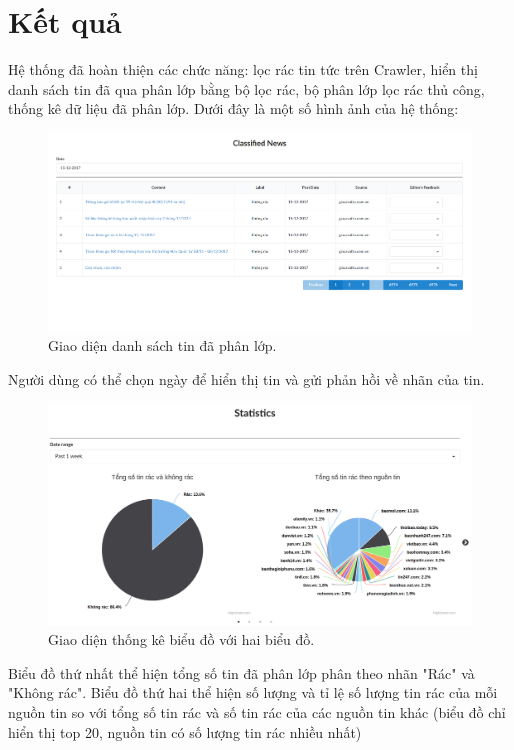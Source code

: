 \section{Kết quả}
Hệ thống đã hoàn thiện các chức năng: lọc rác tin tức trên Crawler, hiển thị danh sách tin đã qua phân lớp bằng bộ lọc rác, bộ phân lớp lọc rác thủ công, thống kê dữ liệu đã phân lớp. Dưới đây là một số hình ảnh của hệ thống:
\begin{figure}[H]
	\centering
	\includegraphics[width=1\linewidth]{Chapter3/Chapter3Figs/Classified.png}
	\caption{Giao diện danh sách tin đã phân lớp.}
	\label{fig:streaming}
\end{figure}
Người dùng có thể chọn ngày để hiển thị tin và gửi phản hồi về nhãn của tin.
\begin{figure}[H]
	\centering
	\includegraphics[width=0.96\linewidth]{Chapter3/Chapter3Figs/Chart1.png}
  \caption{Giao diện thống kê biểu đồ với hai biểu đồ.}
	\label{fig:streamingkeywords}
\end{figure}
 Biểu đồ thứ nhất thể hiện tổng số tin đã phân lớp phân theo nhãn "Rác" và "Không rác". Biểu đồ thứ hai thể hiện số lượng và tỉ lệ số lượng tin rác của mỗi nguồn tin so với tổng số tin rác và số tin rác của các nguồn tin khác (biểu đồ chỉ hiển thị top 20, nguồn tin có số lượng tin rác nhiều nhất)

